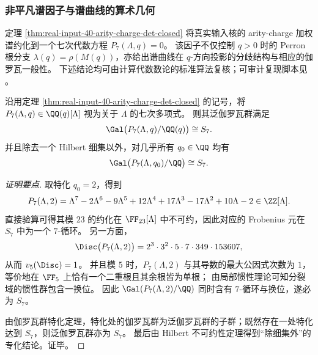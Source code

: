 
\subsubsection{非平凡谱因子与谱曲线的算术几何}\label{app:real-input-40-arity-charge-spectral-curve}
定理 \ref{thm:real-input-40-arity-charge-det-closed} 将真实输入核的 arity-charge 加权谱约化到一个七次代数方程
\(
P_7(\Lambda,q)=0
\)。
该因子不仅控制 \(q>0\) 时的 Perron 根分支 \(\lambda(q)=\rho(M(q))\)，亦给出谱曲线在 \(q\)-方向投影的分歧结构与相应的伽罗瓦一般性。
下述结论均可由计算代数数论的标准算法复核；可审计复现脚本见
。

\begin{theorem}\label{thm:real-input-40-p7-generic-galois-s7}
沿用定理 \ref{thm:real-input-40-arity-charge-det-closed} 的记号，将 \(P_7(\Lambda,q)\in\QQ(q)[\Lambda]\) 视为关于 \(\Lambda\) 的七次多项式。
则其泛伽罗瓦群满足
\[
\Gal\bigl(P_7(\Lambda,q)/\QQ(q)\bigr)\cong S_7.
\]
并且除去一个 Hilbert 细集以外，对几乎所有 \(q_0\in\QQ\) 均有
\[
\Gal\bigl(P_7(\Lambda,q_0)/\QQ\bigr)\cong S_7.
\]
\end{theorem}
\begin{proof}[证明要点]
取特化 \(q_0=2\)，得到
\[
P_7(\Lambda,2)=\Lambda^7-2\Lambda^6-9\Lambda^5+12\Lambda^4+17\Lambda^3-17\Lambda^2+10\Lambda-2\in\ZZ[\Lambda].
\]
直接验算可得其模 \(23\) 的约化在 \(\FF_{23}[\Lambda]\) 中不可约，因此对应的 Frobenius 元在 \(S_7\) 中为一个 \(7\)-循环。
另一方面，
\[
\Disc\bigl(P_7(\Lambda,2)\bigr)=2^3\cdot 3^2\cdot 5\cdot 7\cdot 349\cdot 153607,
\]
从而 \(v_5(\Disc)=1\)。
并且模 \(5\) 时，\(P_7(\Lambda,2)\) 与其导数的最大公因式次数为 \(1\)，等价地在 \(\FF_5\) 上恰有一个二重根且其余根皆为单根；
由局部惯性理论可知分裂域的惯性群包含一换位。
因此 \(\Gal(P_7(\Lambda,2)/\QQ)\) 同时含有 \(7\)-循环与换位，遂必为 \(S_7\)。
\par
由伽罗瓦群特化定理，特化处的伽罗瓦群为泛伽罗瓦群的子群；既然存在一处特化达到 \(S_7\)，则泛伽罗瓦群亦为 \(S_7\)。
最后由 Hilbert 不可约性定理得到“除细集外”的专化结论。证毕。
\end{proof}

